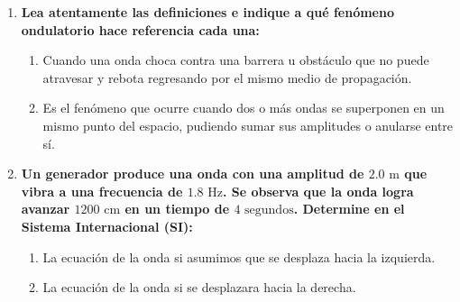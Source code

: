 \documentclass[11pt, letterpaper]{article}
\newif\ifshowanswers
\newcommand{\answer}[1]{ 
	\ifshowanswers 
	\par\vspace{0.15cm} 
	{\color{valblue}\small\textbf{Solución:}\\ #1} 
	\par\vspace{0.15cm} 
	\else 
	\par\vspace{3.5cm} %
	\fi 
}
\begin{document}
\begin{enumerate}[leftmargin=*, itemsep=0.8cm]
		\item \textbf{ Lea atentamente las definiciones e indique a qué fenómeno ondulatorio hace referencia cada una:} 
		\begin{enumerate}[label=\alph*., itemsep=0.4cm, leftmargin=0.8cm] 
			\item Cuando una onda choca contra una barrera u obstáculo que no puede atravesar y rebota regresando por el mismo medio de propagación. \underline{\hspace{5cm}} 
			\answer{\textbf{Reflexión}.} 
			
			\item Es el fenómeno que ocurre cuando dos o más ondas se superponen en un mismo punto del espacio, pudiendo sumar sus amplitudes o anularse entre sí. \underline{\hspace{5cm}} 
			\answer{\textbf{Interferencia} (constructiva o destructiva).} 
		\end{enumerate} 
		
		\item \textbf{ Un generador produce una onda con una amplitud de $2.0\text{ m}$ que vibra a una frecuencia de $1.8\text{ Hz}$. Se observa que la onda logra avanzar $1200\text{ cm}$ en un tiempo de $4\text{ segundos}$. Determine en el Sistema Internacional (SI):} 
		\begin{enumerate}[label=\alph*., itemsep=0.4cm, leftmargin=0.8cm] 
			\item La ecuación de la onda si asumimos que se desplaza hacia la izquierda. 
			\answer{ Datos iniciales: $A = 2.0\text{ m}$, $f = 1.8\text{ Hz} \implies \omega = 2\pi(1.8) = 3.6\pi\text{ rad/s} \approx 11.31\text{ rad/s}$.\\ 
				Velocidad real: $1200\text{ cm} = 12\text{ m}$. Luego $v = \frac{12\text{ m}}{4\text{ s}} = 3.0\text{ m/s}$.\\ 
				Longitud de onda: $\lambda = \frac{v}{f} = \frac{3.0}{1.8} \approx 1.667\text{ m} \implies k = \frac{2\pi}{\lambda} = \frac{2\pi}{1.667} = 1.2\pi\text{ rad/m} \approx 3.77\text{ rad/m}$.\\ 
				Ecuación hacia la \textbf{izquierda} (signo positivo): $y(x,t) = 2.0 \sin(1.2\pi x + 3.6\pi t)$ \quad (o $y(x,t) = 2.0 \sin(3.77 x + 11.31 t)$). } 
			
			\item La ecuación de la onda si se desplazara hacia la derecha. 
			\answer{ Ecuación hacia la \textbf{derecha} (signo negativo): $y(x,t) = 2.0 \sin(1.2\pi x - 3.6\pi t)$ \quad (o $y(x,t) = 2.0 \sin(3.77 x - 11.31 t)$). } 
		\end{enumerate} 
		
	\end{enumerate} 
	
\end{document}
